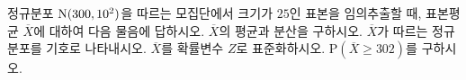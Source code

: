 정규분포 $\mathrm{N}(300{,}\mkern3mu\mathopen{}10^2)$을 따르는 모집단에서 크기가 $25$인 표본을 임의추출할 때, 표본평균 $\overline{X}$에 대하여 다음 물음에 답하시오.
 $\overline{X}$의 평균과 분산을 구하시오.
 $\overline{X}$가 따르는 정규분포를 기호로 나타내시오.
 $\overline{X}$를 확률변수 $Z$로 표준화하시오.
 $\mathrm{P}(\overline{X}\ge 302)$를 구하시오. 
